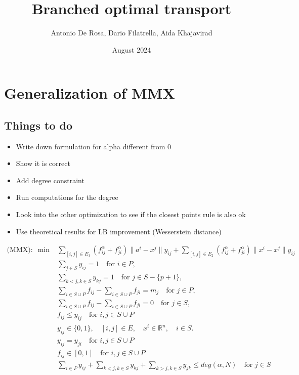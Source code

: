 \documentclass{article}
\title{Branched optimal transport}
\author{Antonio De Rosa, Dario Filatrella, Aida Khajavirad}
\date{August 2024}
\begin{document}
    \maketitle



    


    \section{Generalization of MMX}

    \subsection{Things to do}
    \begin{itemize}
        \item Write down formulation for alpha different from 0
        \item Show it is correct
        \item Add degree constraint
        \item Run computations for the degree
        \item Look into the other optimization to see if the closest points rule is also ok
        \item Use theoretical results for LB improvement (Wesserstein distance)
    \end{itemize}

    \begin{align}
        \text{(MMX)}: \; \min &\sum_{[i,j] \in E_1} (f^{\alpha}_{ij} + f^{\alpha}_{ji})\|a^i - x^j\| y_{ij} + \sum_{[i,j] \in E_2} (f^{\alpha}_{ij} + f^{\alpha}_{ji})\|x^i - x^j\| y_{ij} \\
        & \sum_{j \in S} y_{ij} = 1 \quad \text{for } i \in P, \\
        & \sum_{k < j, k \in S} y_{kj} = 1 \quad \text{for } j \in S - \{p+1\},  \\
        & \sum_{i \in S \cup P} f_{ij} - \sum_{i \in S \cup P} f_{ji} = m_j \quad \text{for } j \in P, \\
        & \sum_{i \in S \cup P} f_{ij} - \sum_{i \in S \cup P} f_{ji} = 0 \quad \text{for } j \in S, \\
        & f_{ij} \le y_{ij} \quad \text{for } i,j \in S \cup P \\
        & y_{ij} \in \{0, 1\}, \quad [i, j] \in E, \quad x^i \in \mathbb{R}^n, \quad i \in S. \\
        & y_{ij} = y_{ji} \quad \text{for } i,j \in S \cup P \\
        & f_{ij} \in [0,1] \quad \text{for } i,j \in S \cup P\\
        & \sum_{i \in P} y_{ij} + \sum_{k < j, k \in S} y_{kj} + \sum_{k > j, k \in S} y_{jk} \le deg(\alpha, N) \quad \text{for } j \in S \\
    \end{align}
\end{document}
